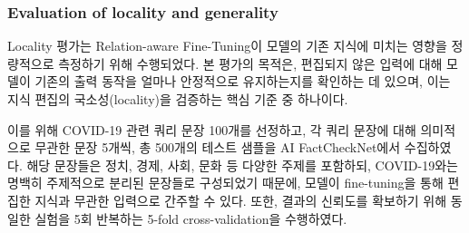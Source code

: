 \documentclass[a4paper,fleqn]{cas-sc}
\begin{document}






\subsubsection{Evaluation of locality and generality}
Locality 평가는 Relation-aware Fine-Tuning이 모델의 기존 지식에 미치는 영향을 정량적으로 측정하기 위해 수행되었다. 본 평가의 목적은, 편집되지 않은 입력에 대해 모델이 기존의 출력 동작을 얼마나 안정적으로 유지하는지를 확인하는 데 있으며, 이는 지식 편집의 국소성(locality)을 검증하는 핵심 기준 중 하나이다.

이를 위해 COVID-19 관련 쿼리 문장 100개를 선정하고, 각 쿼리 문장에 대해 의미적으로 무관한 문장 5개씩, 총 500개의 테스트 샘플을 AI FactCheckNet에서 수집하였다. 해당 문장들은 정치, 경제, 사회, 문화 등 다양한 주제를 포함하되, COVID-19와는 명백히 주제적으로 분리된 문장들로 구성되었기 때문에, 모델이 fine-tuning을 통해 편집한 지식과 무관한 입력으로 간주할 수 있다. 또한, 결과의 신뢰도를 확보하기 위해 동일한 실험을 5회 반복하는 5-fold cross-validation을 수행하였다.
\end{document}
